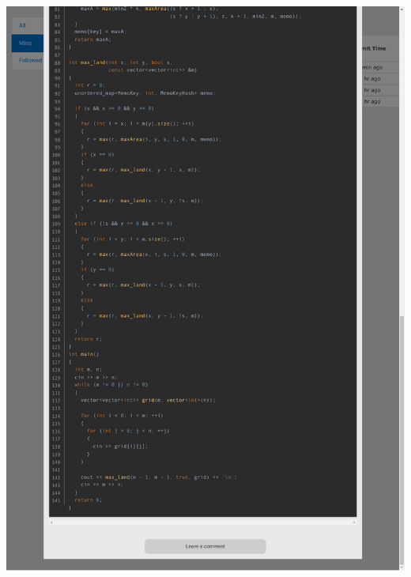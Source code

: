 \documentclass[a4paper, 12pt]{article}
\begin{document}
\includegraphics[clip, trim=40 0 40 25, width=17cm]{10074/submit-3.pdf}\vspace{-2cm}
\end{document}
